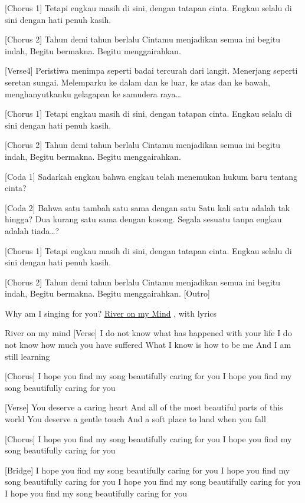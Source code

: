 \documentclass[
  letterpaper,
  DIV=11,
  numbers=noendperiod]{scrreprt}
\begin{document}
{[}Chorus 1{]} Tetapi engkau masih di sini, dengan tatapan cinta. Engkau
selalu di sini dengan hati penuh kasih.

{[}Chorus 2{]} Tahun demi tahun berlalu Cintamu menjadikan semua ini
begitu indah, Begitu bermakna. Begitu menggairahkan.

{[}Verse4{]} Peristiwa menimpa seperti badai tercurah dari langit.
Menerjang seperti seretan sungai. Melemparku ke dalam dan ke luar, ke
atas dan ke bawah, menghanyutkanku gelagapan ke samudera raya\ldots{}

{[}Chorus 1{]} Tetapi engkau masih di sini, dengan tatapan cinta. Engkau
selalu di sini dengan hati penuh kasih.

{[}Chorus 2{]} Tahun demi tahun berlalu Cintamu menjadikan semua ini
begitu indah, Begitu bermakna. Begitu menggairahkan.

{[}Coda 1{]} Sadarkah engkau bahwa engkau telah menemukan hukum baru
tentang cinta?

{[}Coda 2{]} Bahwa satu tambah satu sama dengan satu Satu kali satu
adalah tak hingga? Dua kurang satu sama dengan kosong. Segala sesuatu
tanpa engkau adalah tiada\ldots?

{[}Chorus 1{]} Tetapi engkau masih di sini, dengan tatapan cinta. Engkau
selalu di sini dengan hati penuh kasih.

{[}Chorus 2{]} Tahun demi tahun berlalu Cintamu menjadikan semua ini
begitu indah, Begitu bermakna. Begitu menggairahkan. {[}Outro{]}

Why am I singing for you? \href{./Rivers\%20In\%20My\%20Mind.mp3}{River
on my Mind} , with lyrics

River on my mind {[}Verse{]} I do not know what has happened with your
life I do not know how much you have suffered What I know is how to be
me And I am still learning

{[}Chorus{]} I hope you find my song beautifully caring for you I hope
you find my song beautifully caring for you

{[}Verse{]} You deserve a caring heart And all of the most beautiful
parts of this world You deserve a gentle touch And a soft place to land
when you fall

{[}Chorus{]} I hope you find my song beautifully caring for you I hope
you find my song beautifully caring for you

{[}Bridge{]} I hope you find my song beautifully caring for you I hope
you find my song beautifully caring for you I hope you find my song
beautifully caring for you I hope you find my song beautifully caring
for you
\end{document}
